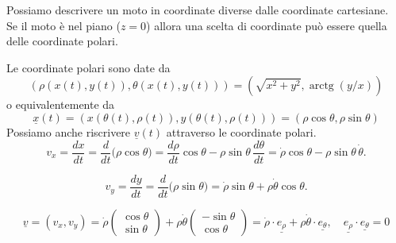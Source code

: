 Possiamo descrivere un moto in coordinate diverse dalle coordinate cartesiane.\\
Se il moto è nel piano ($z=0$) allora una scelta di coordinate può essere quella delle coordinate polari.
\begin{center}
\end{center}

Le coordinate polari sono date da
\[
(\rho(x(t) , y(t)) , \theta(x(t) , y(t))) = (\sqrt{x^2 +y^2} , \operatorname{arctg}(y/x))
\]
o equivalentemente da
\[
\underline{x}(t) = (x(\theta(t) , \rho(t)) ,y(\theta(t) , \rho(t))) = (\rho \cos\theta  , \rho\sin\theta)
\]
Possiamo anche riscrivere $\underline{v}(t)$ attraverso le coordinate polari.
\[
v_x=\frac{dx}{dt}
=\frac{d}{dt}\bigl(\rho\cos\theta\bigr)
=\frac{d\rho}{dt}\cos\theta-\rho\sin\theta\,\frac{d\theta}{dt}
=\dot{\rho}\cos\theta-\rho\sin\theta\,\dot{\theta}.
\]

\[
v_y=\frac{dy}{dt}
=\frac{d}{dt}\bigl(\rho\sin\theta\bigr)
=\dot{\rho}\sin\theta+\rho\dot{\theta}\cos\theta.
\]

\[
\underline{v}=(v_x,v_y)
=
\dot{\rho}
\begin{pmatrix}
\cos\theta\\
\sin\theta
\end{pmatrix}
+
\rho\dot{\theta}
\begin{pmatrix}
-\sin\theta\\
\cos\theta
\end{pmatrix} = \dot{\rho} \cdot \underline{e_\rho} + \rho \dot{\theta} \cdot \underline{e_\theta} , \quad \underline{e_\rho}\cdot \underline{e_\theta}=0
\]

